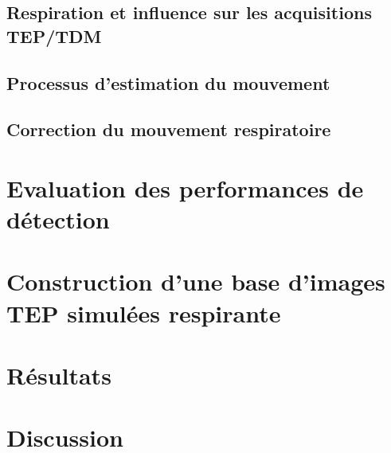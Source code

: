 \documentclass[12pt]{book}
\begin{document}
	\chapter{Respiration et influence sur les acquisitions TEP/TDM}
	
	
	\chapter{Processus d'estimation du mouvement}
	
	
	\chapter{Correction du mouvement respiratoire}
	

\part{Evaluation des performances de détection}
	



\part{Construction d'une base d'images TEP simulées respirante}
	

	



\part{Résultats}
	


\part{Discussion}

	


\newpage
{}




\listoffigures


\listoftables





\end{document}
